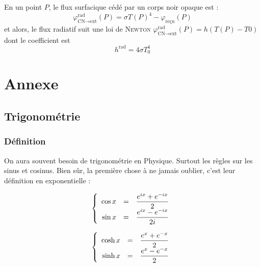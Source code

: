 \documentclass[11pt,a4paper,fleqn,pdftex]{report}
\begin{document}
\begin{theorem}
En un point $P$, le flux surfacique cédé par un corps noir opaque est :
\begin{equation}
\varphi^{\text{rad}}_{\text{CN}\to \text{ext}} (P)=\sigma T(P)^4 - \varphi_{\text{reçu}} (P)
\end{equation}
et alors, le flux radiatif suit une loi de \textsc{Newton} $\varphi^{\text{rad}}_{\text{CN}\to \text{ext}} (P)=h(T(P) - T0)$ dont le coefficient est 
\begin{equation}
h^\text{rad} = 4\sigma T_0^4
\end{equation}
\end{theorem}
\chapter{Annexe}
\section{Trigonométrie}
\subsection{Définition}
On aura souvent besoin de trigonométrie en Physique. Surtout les règles sur les sinus et cosinus. Bien sûr, la première chose à ne jamais oublier, c'est leur définition en exponentielle : \\
%
\begin{minipage}{7cm}
\begin{equation}\label{def:cos}
\left\lbrace
\begin{array}{r c l}
\cos{x}&=&\dfrac{e^{ix}+e^{-ix}}{2}\\
\sin{x}&=&\dfrac{e^{ix}-e^{-ix}}{2i}\\
\end{array}
\right.
\end{equation}
\end{minipage}
\begin{minipage}{7cm}
\begin{equation}\label{def:cosh}
\left\lbrace
\begin{array}{r c l}
\cosh{x}&=&\dfrac{e^{x}+e^{-x}}{2}\\
\sinh{x}&=&\dfrac{e^{x}-e^{-x}}{2}\\
\end{array}
\right.
\end{equation}
\end{minipage}
%
\end{document}
